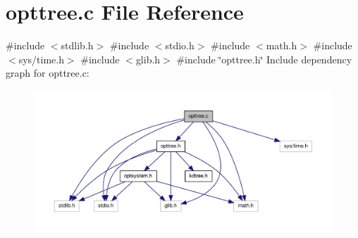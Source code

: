 \hypertarget{a00019}{\section{opttree.\-c \-File \-Reference}
\label{dd/da2/a00019}
}
{\ttfamily \#include $<$stdlib.\-h$>$}\*
{\ttfamily \#include $<$stdio.\-h$>$}\*
{\ttfamily \#include $<$math.\-h$>$}\*
{\ttfamily \#include $<$sys/time.\-h$>$}\*
{\ttfamily \#include $<$glib.\-h$>$}\*
{\ttfamily \#include \char`\"{}opttree.\-h\char`\"{}}\*
\-Include dependency graph for opttree.\-c\-:
\nopagebreak
\begin{figure}[H]
\begin{center}
\leavevmode
\includegraphics[width=350pt]{df/d61/a00031}
\end{center}
\end{figure}

